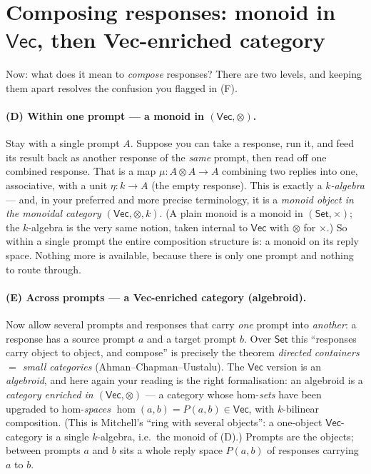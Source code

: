 \documentclass[11pt]{article}
\providecommand{\Vec}{}\renewcommand{\Vec}{\mathsf{Vec}}
\newcommand{\Set}{\mathsf{Set}}
\newcommand{\fld}{k}
\begin{document}
\section{Composing responses: monoid in $\Vec$, then Vec-enriched category}

Now: what does it mean to \emph{compose} responses? There are two levels, and keeping
them apart resolves the confusion you flagged in (F).

\paragraph{(D) Within one prompt --- a monoid in $(\Vec,\otimes)$.}
Stay with a single prompt $A$. Suppose you can take a response, run it, and feed its
result back as another response of the \emph{same} prompt, then read off one combined
response. That is a map $\mu\colon A\otimes A\to A$ combining two replies into one,
associative, with a unit $\eta\colon\fld\to A$ (the empty response). This is exactly a
\emph{$\fld$-algebra} --- and, in your preferred and more precise terminology, it is a
\emph{monoid object in the monoidal category $(\Vec,\otimes,\fld)$}. (A plain monoid
is a monoid in $(\Set,\times)$; the $\fld$-algebra is the very same notion, taken
internal to $\Vec$ with $\otimes$ for $\times$.) So within a single prompt the entire
composition structure is: a monoid on its reply space. Nothing more is available,
because there is only one prompt and nothing to route through.

\paragraph{(E) Across prompts --- a Vec-enriched category (algebroid).}
Now allow several prompts and responses that carry \emph{one} prompt into
\emph{another}: a response has a source prompt $a$ and a target prompt $b$. Over
$\Set$ this ``responses carry object to object, and compose'' is precisely the theorem
\emph{directed containers $=$ small categories} (Ahman--Chapman--Uustalu). The $\Vec$
version is an \emph{algebroid}, and here again your reading is the right formalisation:
an algebroid is a \emph{category enriched in $(\Vec,\otimes)$} --- a category whose
hom-\emph{sets} have been upgraded to hom-\emph{spaces}
$\hom(a,b)=P(a,b)\in\Vec$, with $\fld$-bilinear composition. (This is Mitchell's
``ring with several objects'': a one-object $\Vec$-category is a single $\fld$-algebra,
i.e.\ the monoid of (D).) Prompts are the objects; between prompts $a$ and $b$ sits a
whole reply space $P(a,b)$ of responses carrying $a$ to $b$.
\end{document}
